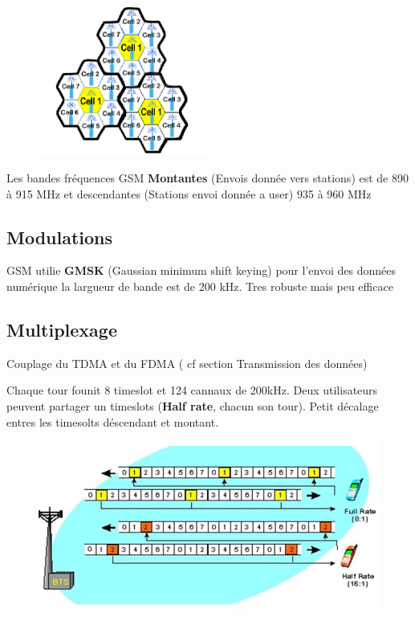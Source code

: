  			\begin{figure}[H]
				\centering
				\includegraphics[width=0.5\textwidth]{img/CM/PF.png}
			\end{figure}
			
			Les bandes fréquences GSM \textbf{Montantes} (Envois donnée vers stations) est de 890 à 915 MHz et descendantes (Stations envoi donnée a user) 935 à 960 MHz
			
	\subsection{Modulations}
		GSM utilie \textbf{GMSK} (Gaussian minimum shift keying) pour l'envoi des données numérique la largueur de bande est de 200 kHz. Tres robuste mais peu efficace
		
	\subsection{Multiplexage}
 		Couplage du TDMA et du FDMA ( cf section Transmission des données)
 		
 		Chaque tour founit 8 timeslot et 124 cannaux de 200kHz. Deux utilisateurs peuvent partager un timeslots (\textbf{Half rate}, chacun son tour). Petit décalage entres les timesolts déscendant et montant.
 		
 		\begin{figure}[H]
 			\centering
 			\includegraphics[width=\textwidth]{img/CM/HR.png}
 		\end{figure}
 		
